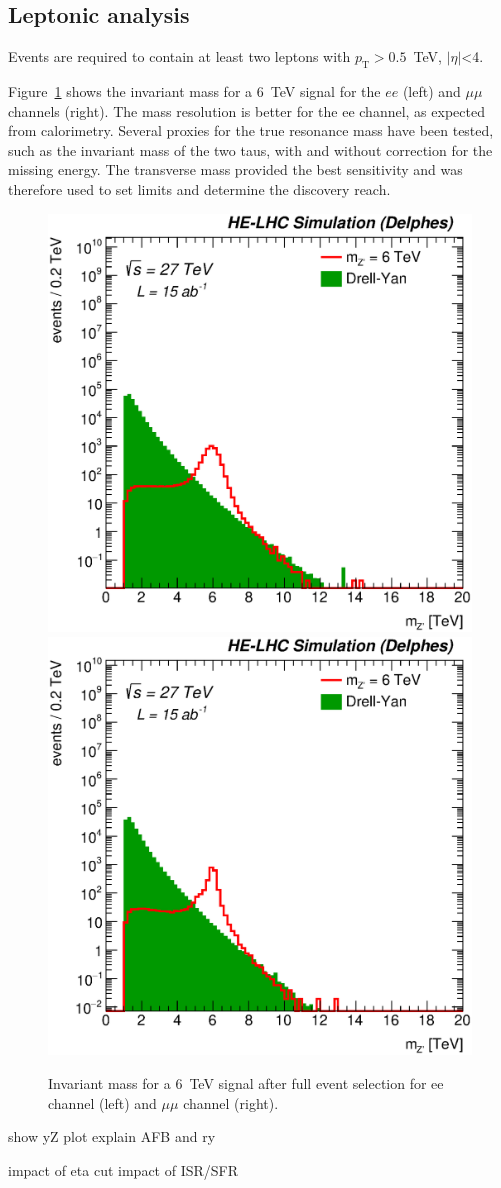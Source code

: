 \documentclass[14pt]{article}
\newcommand*{\pt}{\ensuremath{p_{\text{T}}}}
\begin{document}
\subsection{Leptonic analysis}
Events are required to contain at least two leptons with $\pt > 0.5$~TeV, $|\eta|$<4. 

Figure~\ref{figure:lepana:mass} shows the invariant mass for a 6~TeV signal for the $ee$ (left) and $\mu\mu$ channels (right). 
The mass resolution is better for the ee channel, as expected from calorimetry. 
Several proxies for the true resonance mass have been tested, such as the invariant mass of the two taus, with and without correction for the missing energy. The transverse mass provided the best sensitivity and was therefore used to set limits and determine the discovery reach.

\label{sec:lepana}
\begin{figure}[h]
  \centering
    \includegraphics[width=0.45\columnwidth]{figures/Zpmumu_mzp_sel0_nostack_log.eps}
    \includegraphics[width=0.45\columnwidth]{figures/Zpee_mzp_sel0_nostack_log.eps}
   \caption{Invariant mass for a 6~TeV signal after full event selection for ee channel (left) and $\mu\mu$ channel (right).}
  \label{figure:lepana:mass}
\end{figure}

show yZ plot
explain AFB and ry

impact of eta cut
impact of ISR/SFR
\end{document}
